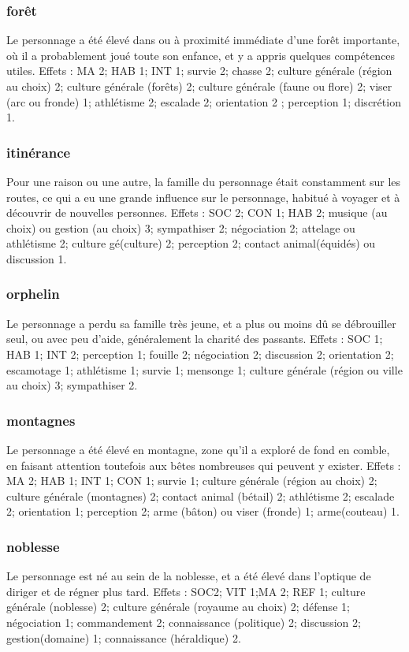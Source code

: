 \documentclass[10pt,a4paper,twocolumn]{book}
\begin{document}
\subsubsection{forêt}
Le personnage a été élevé dans ou à proximité immédiate d’une forêt importante, où il a probablement joué toute son enfance, et y a appris quelques compétences utiles.
Effets  : MA 2; HAB 1; INT 1; survie 2; chasse 2; culture générale (région au choix) 2; culture générale (forêts) 2; culture générale (faune ou flore) 2; viser (arc ou fronde) 1; athlétisme 2; escalade 2; orientation 2 ; perception 1; discrétion 1.
\subsubsection{itinérance}
Pour une raison ou une autre, la famille du personnage était constamment sur les routes, ce qui a eu une grande influence sur le personnage, habitué à voyager et à découvrir de nouvelles personnes.
Effets : SOC 2; CON 1; HAB 2; musique (au choix) ou gestion (au choix) 3; sympathiser 2; négociation 2; attelage ou athlétisme 2; culture gé(culture) 2; perception 2; contact animal(équidés) ou discussion 1.
\subsubsection{orphelin}
Le personnage a perdu sa famille très jeune, et a plus ou moins dû se débrouiller seul, ou avec peu d’aide, généralement la charité des passants.
Effets : SOC 1; HAB 1; INT 2; perception 1; fouille 2; négociation 2; discussion 2; orientation 2; escamotage 1; athlétisme 1; survie 1; mensonge 1; culture générale (région ou ville au choix) 3; sympathiser 2.
\subsubsection{montagnes}
Le personnage a été élevé en montagne, zone qu’il a exploré de fond en comble, en faisant attention toutefois aux bêtes nombreuses qui peuvent y exister.
Effets : MA 2; HAB 1; INT 1; CON 1; survie 1; culture générale (région au choix) 2; culture générale (montagnes) 2; contact animal (bétail) 2; athlétisme 2;  escalade 2; orientation 1; perception 2; arme (bâton) ou viser (fronde) 1; arme(couteau) 1.
\subsubsection{noblesse}
Le personnage est né au sein de la noblesse, et a été élevé dans l’optique de diriger et de régner plus tard.
Effets : SOC2; VIT 1;MA 2; REF 1; culture générale (noblesse) 2; culture générale (royaume au choix) 2; défense 1; négociation 1; commandement 2; connaissance (politique) 2; discussion 2; gestion(domaine) 1; connaissance (héraldique) 2. 
\end{document}
